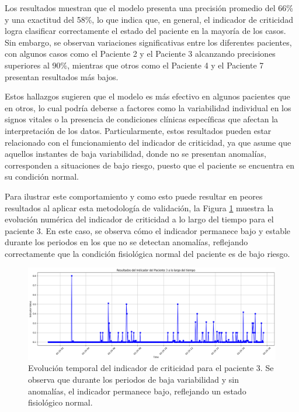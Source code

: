 Los resultados muestran que el modelo presenta una precisión promedio del 66\% y una exactitud del 58\%, lo que indica que, en general, el indicador de criticidad logra clasificar correctamente el estado del paciente en la mayoría de los casos. Sin embargo, se observan variaciones significativas entre los diferentes pacientes, con algunos casos como el Paciente 2 y el Paciente 3 alcanzando precisiones superiores al 90\%, mientras que otros como el Paciente 4 y el Paciente 7 presentan resultados más bajos.

Estos hallazgos sugieren que el modelo es más efectivo en algunos pacientes que en otros, lo cual podría deberse a factores como la variabilidad individual en los signos vitales o la presencia de condiciones clínicas específicas que afectan la interpretación de los datos. Particularmente, estos resultados pueden estar relacionado con el funcionamiento del indicador de criticidad, ya que asume que aquellos instantes de baja variabilidad, donde no se presentan anomalías, corresponden a situaciones de bajo riesgo, puesto que el paciente se encuentra en su condición normal.

Para ilustrar este comportamiento y como esto puede resultar en peores resultados al aplicar esta metodología de validación, la Figura \ref{fig:indicador_tiempo_paciente3} muestra la evolución numérica del indicador de criticidad a lo largo del tiempo para el paciente 3. En este caso, se observa cómo el indicador permanece bajo y estable durante los periodos en los que no se detectan anomalías, reflejando correctamente que la condición fisiológica normal del paciente es de bajo riesgo.

\begin{figure}[H]
  \centering
  \includegraphics[width=\textwidth]{Images/indicador_de_criticidad_cambio.png}
  \caption{Evolución temporal del indicador de criticidad para el paciente 3. Se observa que durante los periodos de baja variabilidad y sin anomalías, el indicador permanece bajo, reflejando un estado fisiológico normal.}
  \label{fig:indicador_tiempo_paciente3}
\end{figure}

